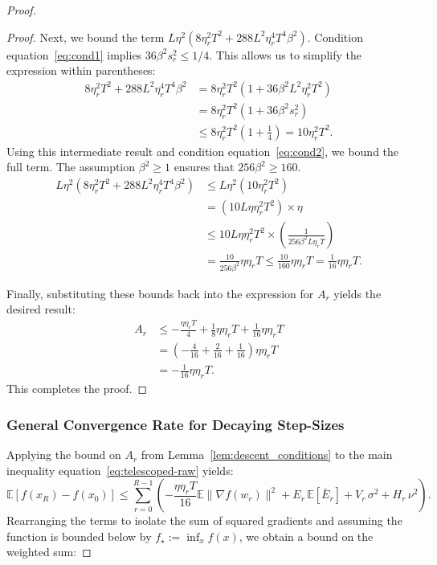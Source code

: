 \documentclass{article} %
\def\eqref#1{equation~\ref{#1}}
\newcommand{\E}{\mathbb{E}}
\begin{document}
\begin{proof}
\begin{proof}
Next, we bound the term $L\eta^2(8\eta_r^2 T^2 + 288 L^2 \eta_r^4 T^4 \beta^2)$. Condition \eqref{eq:cond1} implies $36\beta^2 s_r^2 \le 1/4$. This allows us to simplify the expression within parentheses:
\begin{align*}
    8\eta_r^2 T^2 + 288 L^2 \eta_r^4 T^4 \beta^2 &= 8\eta_r^2 T^2 \left(1 + 36 \beta^2 L^2 \eta_r^2 T^2 \right) \\
    &= 8\eta_r^2 T^2 (1 + 36 \beta^2 s_r^2) \\
    &\le 8\eta_r^2 T^2 \left(1 + \frac{1}{4}\right) = 10\eta_r^2 T^2.
\end{align*}
Using this intermediate result and condition \eqref{eq:cond2}, we bound the full term. The assumption $\beta^2 \ge 1$ ensures that $256\beta^2 \ge 160$.
\begin{align*}
    L\eta^2(8\eta_r^2 T^2 + 288 L^2 \eta_r^4 T^4 \beta^2) &\le L\eta^2(10\eta_r^2 T^2) \\
    &= (10 L \eta \eta_r^2 T^2) \times \eta \\
    &\le 10 L \eta \eta_r^2 T^2 \times \left( \frac{1}{256\beta^2 L \eta_r T} \right) \\
    &= \frac{10}{256\beta^2} \eta \eta_r T \le \frac{10}{160} \eta \eta_r T = \frac{1}{16} \eta \eta_r T.
\end{align*}

Finally, substituting these bounds back into the expression for $A_r$ yields the desired result:
\begin{align*}
    A_r &\le -\frac{\eta\eta_r T}{4} + \frac{1}{8}\eta\eta_r T + \frac{1}{16}\eta\eta_r T \\
    &= \left( -\frac{4}{16} + \frac{2}{16} + \frac{1}{16} \right) \eta\eta_r T \\
    &= -\frac{1}{16}\eta\eta_r T.
\end{align*}
This completes the proof.
\end{proof}

\subsubsection{General Convergence Rate for Decaying Step-Sizes}

Applying the bound on $A_r$ from Lemma~\ref{lem:descent_conditions} to the main inequality \eqref{eq:telescoped-raw} yields:
\[
\E[f(x_R) - f(x_0)] \le \sum_{r=0}^{R-1} \left( -\frac{\eta\eta_r T}{16} \E\|\nabla f(w_r)\|^2 + E_r\,\E[\bar E_r] + V_r\,\sigma^{2} + H_r\,\nu^{2} \right).
\]
Rearranging the terms to isolate the sum of squared gradients and assuming the function is bounded below by $f_\star := \inf_x f(x)$, we obtain a bound on the weighted sum:


\end{proof}
\end{document}
